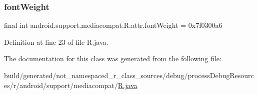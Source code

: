 \subsubsection{\texorpdfstring{fontWeight}{fontWeight}}
{\footnotesize\ttfamily final int android.\+support.\+mediacompat.\+R.\+attr.\+font\+Weight = 0x7f0300a6\hspace{0.3cm}{\ttfamily [static]}}



Definition at line 23 of file R.\+java.



The documentation for this class was generated from the following file\+:\begin{DoxyCompactItemize}
\item 
build/generated/not\+\_\+namespaced\+\_\+r\+\_\+class\+\_\+sources/debug/process\+Debug\+Resources/r/android/support/mediacompat/\mbox{\hyperlink{android_2support_2mediacompat_2_r_8java}{R.\+java}}\end{DoxyCompactItemize}
